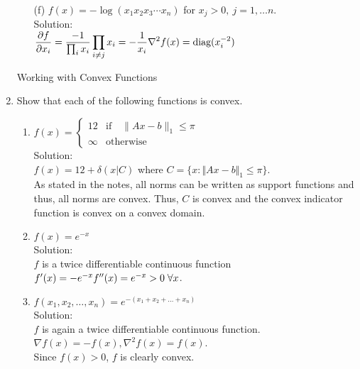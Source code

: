 \documentclass[12pt]{amsart}
\newcommand{\norm}[1]{\Vert #1 \Vert}
\newcommand{\grad}{\nabla}
\begin{document}
\begin{enumerate}
\begin{enumerate}
\item[(f)] $f(x)=-\log(x_1x_2x_3\cdots x_n)$ for $x_j>0,\ j=1,\dots n$.\\

\noindent
Solution:\\
$\displaystyle \frac{\partial f}{\partial x_i} = \frac{-1}{\prod_i x_i} \prod_{i \neq j} x_i = -\frac{1}{x_i} \\
\grad^2 f(x) = \text{diag}(x_i^{-2})$\\
\end{enumerate}


\noindent
{\sf Working with Convex Functions}

\item
Show that each of the following functions is convex.
\begin{enumerate}
\item $f(x) = \begin{cases} 12 &\text{if}  \quad \|Ax - b\|_1 \leq \pi \\ \infty & \text{otherwise}\end{cases}$\\

\noindent
Solution:\\
$f(x) = 12 + \delta(x|C)$ where $C = \{x: \norm{Ax-b}_1 \leq \pi\}$.\\
As stated in the notes, all norms can be written as support functions and thus, all norms are convex.  Thus, $C$ is convex and the convex indicator function is convex on a convex domain.\\

\item
$f(x)=e^{-x}$ \\

Solution:\\
$f$ is a twice differentiable continuous function\\ 
$f'(x) = -e^{-x}\\
f''(x) = e^{-x} > 0 \; \forall x$. \\ 

\item
$f(x_1,x_2,\dots,x_n)=e^{-(x_1+x_2+\dots +x_n)}$\\

Solution:\\
$f$ is again a twice differentiable continuous function.\\
 $\grad f(x) = -f(x), \grad^2 f(x) = f(x)$.\\
Since $f(x) > 0$, $f$ is clearly convex.\\


\end{enumerate}
\end{enumerate}
\end{document}
